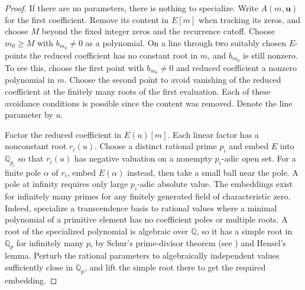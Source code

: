 \documentclass[11pt]{article}
\newcommand{\QQ}{\mathbb Q}
\begin{document}
\begin{proof}
If there are no parameters, there is nothing to specialize.
Write \(A(m,\boldsymbol u)\) for the first coefficient. Remove its
content in \(E[m]\) when tracking its zeros, and choose \(M\) beyond
the fixed integer zeros and the recurrence cutoff. Choose
\(m_0\ge M\) with \(b_{m_0}\ne0\) as a polynomial. On a line through
two suitably chosen \(E\)-points the reduced coefficient has no
constant root in \(m\), and \(b_{m_0}\) is still nonzero. To see this,
choose the first point with \(b_{m_0}\ne0\) and reduced coefficient
a nonzero polynomial in \(m\). Choose the second point to avoid
vanishing of the reduced coefficient at the finitely many roots
of the first evaluation. Each of these avoidance conditions is
possible since the content was removed. Denote the line parameter
by \(u\).

Factor the reduced coefficient in \(E(u)[m]\). Each linear factor
has a nonconstant root \(r_i(u)\). Choose a distinct rational
prime \(p_i\) and embed \(E\) into \(\QQ_{p_i}\) so that \(r_i(u)\)
has negative valuation on a nonempty \(p_i\)-adic open set. For
a finite pole \(\alpha\) of \(r_i\), embed \(E(\alpha)\) instead,
then take a small ball near the pole. A pole at infinity requires
only large \(p_i\)-adic absolute value. The embeddings exist for
infinitely many primes for any finitely generated field of
characteristic zero. Indeed, specialize a transcendence basis to
rational values where a minimal polynomial of a primitive element
has no coefficient poles or multiple roots. A root of the specialized
polynomial is algebraic over \(\QQ\), so it has a simple root in
\(\QQ_p\) for infinitely many \(p\), by Schur's prime-divisor theorem
(see \cite[Section~7]{Complex}) and Hensel's lemma. Perturb the rational parameters to algebraically
independent values sufficiently close in \(\QQ_p\), and lift the
simple root there to get the required embedding.


\end{proof}
\end{document}
